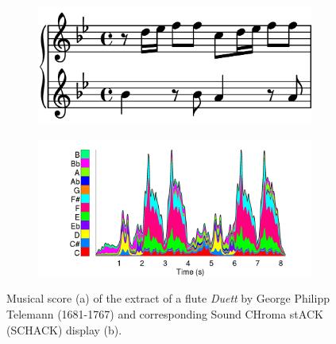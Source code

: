 \documentclass{article}
\begin{document}
\begin{figure}
 \centering
\begin{subfigure}[b]{.4\textwidth}
\caption{}
\includegraphics[width=\textwidth]{telemann}
\label{fig:telemann}
\end{subfigure}
\begin{subfigure}[b]{\textwidth}
\caption{}
\includegraphics[width=\textwidth]{duoFluteMono_schack}
\label{fig:duoFluteMono_schack}
\end{subfigure}
\caption{Musical score (a) of the extract of a flute \textit{Duett} by George Philipp Telemann (1681-1767) and corresponding Sound CHroma stACK (SCHACK) display (b).}
\label{fig:schack}
\end{figure}
\end{document}
